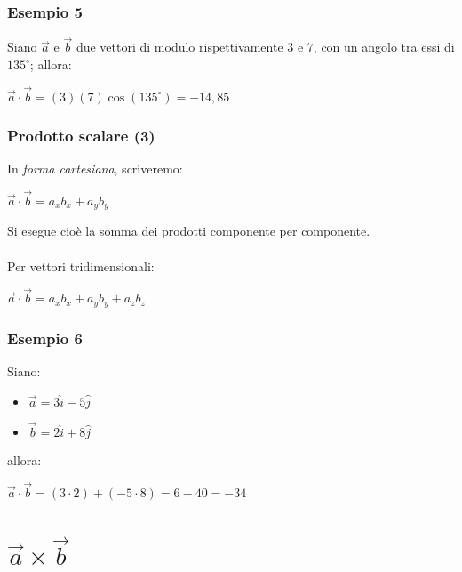 \documentclass[]{beamer}
\theoremstyle{plain}
\begin{document}
\begin{frame}
  \frametitle{Esempio 5}


Siano $ \vec{a} $ e $ \vec{b} $ due vettori di modulo rispettivamente $ 3 $ e $ 7 $, con un angolo tra essi di $ 135^\circ $; allora:
\begin{center}
$ \vec{a} \cdot \vec{b} = (3)(7)\cos(135^\circ) = -14,85 $
\end{center}

\end{frame}


\begin{frame}
  \frametitle{Prodotto scalare (3)}
  In \emph{forma cartesiana}, scriveremo:
  \begin{center}
\colorbox{blue!30}{ $ \vec{a} \cdot \vec{b} = a_x b_x + a_y b_y $ }
\end{center}
Si esegue cioè la somma dei prodotti componente per componente.\pause~\\~\\
Per vettori tridimensionali:
\begin{center}
$ \vec{a} \cdot \vec{b} = a_x b_x + a_y b_y + a_z b_z $
\end{center}
\end{frame}




\begin{frame}
  \frametitle{Esempio 6}


Siano:
\begin{itemize}
  \item $ \vec{a} = 3 \hat{i} - 5\hat{j} $
  \item $ \vec{b} = 2 \hat{i} + 8 \hat{j} $
\end{itemize}
allora:
\begin{center}
$ \vec{a} \cdot \vec{b} = (3\cdot 2) + (-5\cdot 8) = 6-40= -34 $
\end{center}

\end{frame}






\section{$ \vec{a}\times\vec{b} $}
\end{document}
